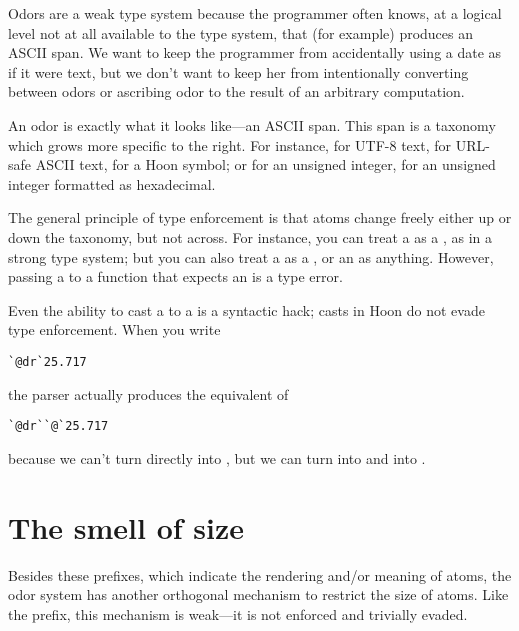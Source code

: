 Odors are a weak type system because the programmer often knows,
at a logical level not at all available to the type system, that
(for example)  produces an ASCII span.
We want to keep the programmer from accidentally using a date as
if it were text, but we don't want to keep her from intentionally
converting between odors or ascribing odor to the result of an
arbitrary computation.

An odor is exactly what it looks like---an ASCII span.  This span
is a taxonomy which grows more specific to the right.  For
instance,  for UTF-8 text,  for URL-safe ASCII text,
 for a Hoon symbol; or  for an unsigned integer, 
for an unsigned integer formatted as hexadecimal.

The general principle of type enforcement is that atoms change
freely either up or down the taxonomy, but not across.  For
instance, you can treat a  as a , as in a strong type
system; but you can also treat a  as a , or an  as
anything.  However, passing a  to a function that expects an
 is a type error.

Even the ability to cast a  to a  is a syntactic hack;
casts in Hoon do not evade type enforcement.  When you write

\begin{framed_shaded}
\begin{Verbatim}[fontsize=\relsize{-2.5},fontseries=b,commandchars=\\\{\}]
`@dr`25.717
\end{Verbatim}
\end{framed_shaded}
the parser actually produces the equivalent of

\begin{framed_shaded}
\begin{Verbatim}[fontsize=\relsize{-2.5},fontseries=b,commandchars=\\\{\}]
`@dr``@`25.717
\end{Verbatim}
\end{framed_shaded}
because we can't turn  directly into , but we can turn
 into  and  into .

\section{The smell of size}

Besides these prefixes, which indicate the rendering and/or
meaning of atoms, the odor system has another orthogonal
mechanism to restrict the size of atoms.  Like the prefix, this
mechanism is weak---it is not enforced and trivially evaded.

